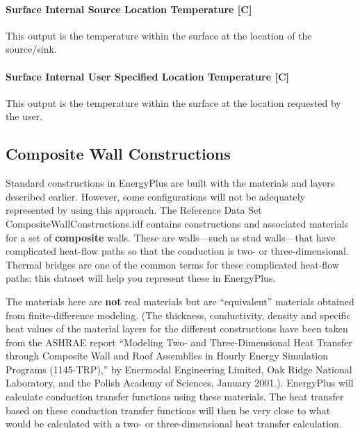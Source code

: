 \paragraph{Surface Internal Source Location Temperature {[}C{]}}\label{surface-internal-source-location-temperature-c}

This output is the temperature within the surface at the location of the source/sink.

\paragraph{Surface Internal User Specified Location Temperature {[}C{]}}\label{surface-internal-user—specified-location-temperature-c}

This output is the temperature within the surface at the location requested by the user.


\subsection{Composite Wall Constructions}\label{composite-wall-constructions}

Standard constructions in EnergyPlus are built with the materials and layers described earlier. However, some configurations will not be adequately represented by using this approach. The Reference Data Set CompositeWallConstructions.idf contains constructions and associated materials for a set of \textbf{composite} walls. These are walls---such as stud walls---that have complicated heat-flow paths so that the conduction is two- or three-dimensional. Thermal bridges are one of the common terms for these complicated heat-flow paths; this dataset will help you represent these in EnergyPlus.

The materials here are \textbf{not} real materials but are ``equivalent'' materials obtained from finite-difference modeling. (The thickness, conductivity, density and specific heat values of the material layers for the different constructions have been taken from the ASHRAE report ``Modeling Two- and Three-Dimensional Heat Transfer through Composite Wall and Roof Assemblies in Hourly Energy Simulation Programs (1145-TRP),'' by Enermodal Engineering Limited, Oak Ridge National Laboratory, and the Polish Academy of Sciences, January 2001.). EnergyPlus will calculate conduction transfer functions using these materials. The heat transfer based on these conduction transfer functions will then be very close to what would be calculated with a two- or three-dimensional heat transfer calculation.

